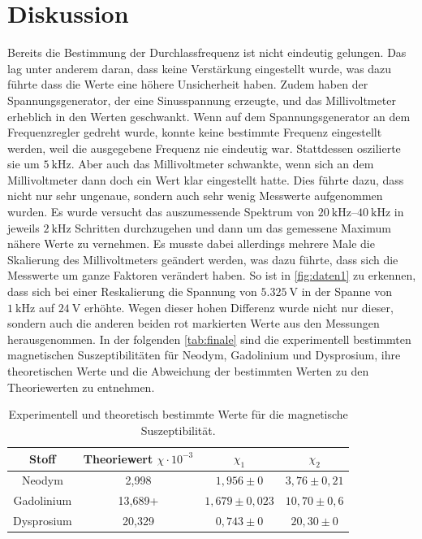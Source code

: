 \section{Diskussion}
\label{sec:Diskussion}
Bereits die Bestimmung der Durchlassfrequenz ist nicht eindeutig gelungen. Das lag unter anderem daran, dass keine Verstärkung eingestellt wurde, was dazu führte dass die Werte eine
höhere Unsicherheit haben. Zudem haben der Spannungsgenerator, der eine Sinusspannung erzeugte, und das Millivoltmeter erheblich in den Werten geschwankt. Wenn auf dem Spannungsgenerator an dem Frequenzregler gedreht wurde, 
konnte keine bestimmte Frequenz eingestellt werden, weil die ausgegebene Frequenz nie eindeutig war. Stattdessen oszilierte sie um $\SI{5}{\kilo\hertz}$.
Aber auch das Millivoltmeter schwankte, wenn sich an dem Millivoltmeter dann doch ein Wert klar eingestellt hatte. Dies führte dazu, dass nicht nur sehr ungenaue, sondern auch sehr wenig Messwerte aufgenommen wurden.
Es wurde versucht das auszumessende Spektrum von $\SIrange{20}{40}{\kilo\hertz}$ in jeweils $\SI{2}{\kilo\hertz}$ Schritten durchzugehen und dann um das gemessene Maximum nähere Werte zu vernehmen.
Es musste dabei allerdings mehrere Male die Skalierung des Millivoltmeters geändert werden, was dazu führte, dass sich die Messwerte um ganze Faktoren verändert haben. 
So ist in \autoref{fig:daten1} zu erkennen, dass sich bei einer Reskalierung die Spannung von $\SI{5,325}{\volt}$ in der Spanne von $\SI{1}{\kilo\hertz}$ auf $\SI{24}{\volt}$ erhöhte.
Wegen dieser hohen Differenz wurde nicht nur dieser, sondern auch die anderen beiden rot markierten Werte aus den Messungen herausgenommen. 
In der folgenden \autoref{tab:finale} sind die experimentell bestimmten magnetischen Suszeptibilitäten für Neodym, Gadolinium und Dysprosium, ihre theoretischen Werte und die Abweichung der bestimmten Werten zu den Theoriewerten zu entnehmen.
\begin{table}[H]
    \centering
    \caption{Experimentell und theoretisch bestimmte Werte für die magnetische Suszeptibilität.}
    \label{tab:finale}
    \begin{tabular}{c| c c c}
        \toprule
        Stoff & Theoriewert $\chi \cdot 10^{-3} $ & $\chi_1$ & $\chi_2$ \\
        \midrule
        Neodym & 2,998 & $1,956 \pm 0$ & $3,76 \pm 0,21$ \\
        Gadolinium & 13,689+ & $1,679 \pm 0,023$ & $10,70 \pm 0,6$ \\
        Dysprosium & 20,329 &$0,743 \pm 0$ & $20,30 \pm 0$ \\
      \bottomrule
    \end{tabular}
\end{table}

